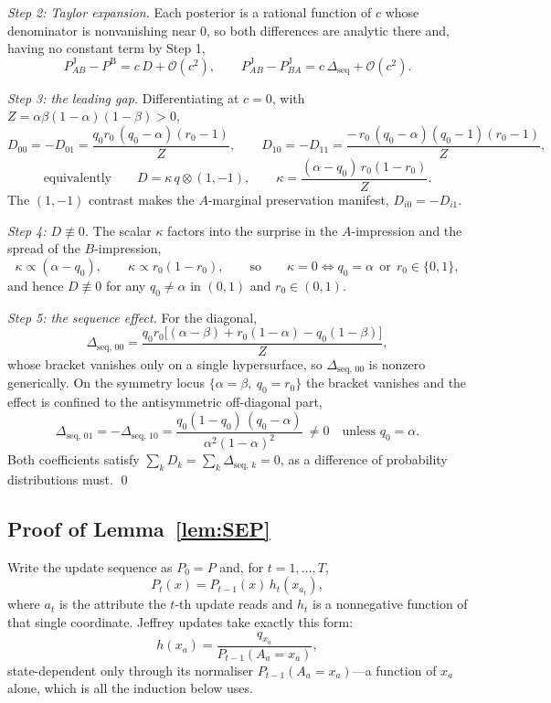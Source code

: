 \documentclass[a4paper,fleqn]{cas-sc}
\theoremstyle{remark}
\theoremstyle{definition}
\newcommand{\PB}{P^{\mathrm{B}}}
\newcommand{\PJ}{P^{\mathrm{J}}}
\newcommand{\bigO}{\mathcal{O}}
\begin{document}
\emph{Step 2: Taylor expansion.} Each posterior is a rational function of $c$ whose denominator
is nonvanishing near $0$, so both differences are analytic there and, having no constant term by
Step 1,
\[
  \PJ_{AB}-\PB=c\,D+\bigO(c^{2}),
  \qquad
  \PJ_{AB}-\PJ_{BA}=c\,\Delta_{\mathrm{seq}}+\bigO(c^{2}) .
\]

\emph{Step 3: the leading gap.} Differentiating at $c=0$, with
$Z=\alpha\beta(1-\alpha)(1-\beta)>0$,
\[
  D_{00}=-D_{01}=\frac{q_0 r_0\,(q_0-\alpha)(r_0-1)}{Z},
  \qquad
  D_{10}=-D_{11}=\frac{-\,r_0\,(q_0-\alpha)(q_0-1)(r_0-1)}{Z},
\]
\[
  \text{equivalently}\qquad
  D=\kappa\,q\otimes(1,-1),
  \qquad
  \kappa=\frac{(\alpha-q_0)\,r_0(1-r_0)}{Z} .
\]
The $(1,-1)$ contrast makes the $A$-marginal preservation manifest, $D_{i0}=-D_{i1}$.

\emph{Step 4: $D\not\equiv0$.} The scalar $\kappa$ factors into the surprise in the
$A$-impression and the spread of the $B$-impression,
\[
  \kappa\propto(\alpha-q_0),
  \qquad
  \kappa\propto r_0(1-r_0),
  \qquad\text{so}\qquad
  \kappa=0
  \iff
  q_0=\alpha \ \ \text{or}\ \ r_0\in\{0,1\},
\]
and hence $D\not\equiv0$ for any $q_0\neq\alpha$ in $(0,1)$ and $r_0\in(0,1)$.

\emph{Step 5: the sequence effect.} For the diagonal,
\[
  \Delta_{\mathrm{seq},\,00}
   =\frac{q_0 r_0\bigl[(\alpha-\beta)+r_0(1-\alpha)-q_0(1-\beta)\bigr]}{Z},
\]
whose bracket vanishes only on a single hypersurface, so $\Delta_{\mathrm{seq},\,00}$ is nonzero
generically. On the symmetry locus $\{\alpha=\beta,\ q_0=r_0\}$ the bracket vanishes and the
effect is confined to the antisymmetric off-diagonal part,
\[
  \Delta_{\mathrm{seq},\,01}=-\Delta_{\mathrm{seq},\,10}
   =\frac{q_0(1-q_0)\,(q_0-\alpha)}{\alpha^{2}(1-\alpha)^{2}}
  \ \neq 0
  \quad\text{unless } q_0=\alpha .
\]
Both coefficients satisfy $\sum_k D_k=\sum_k\Delta_{\mathrm{seq},\,k}=0$, as a difference of
probability distributions must.
\qed

\subsection{Proof of Lemma~\ref{lem:SEP}}

Write the update sequence as $P_{0}=P$ and, for $t=1,\dots,T$,
\[
  P_{t}(x)=P_{t-1}(x)\,h_{t}(x_{a_{t}}),
\]
where $a_{t}$ is the attribute the $t$-th update reads and $h_{t}$ is a nonnegative function
of that single coordinate. Jeffrey updates take exactly this form:
\[
  h(x_{a})=\frac{q_{x_{a}}}{P_{t-1}(A_{a}{=}x_{a})},
\]
state-dependent only through its normaliser $P_{t-1}(A_a{=}x_a)$---a function of $x_{a}$ alone,
which is all the induction below uses.
\end{document}
